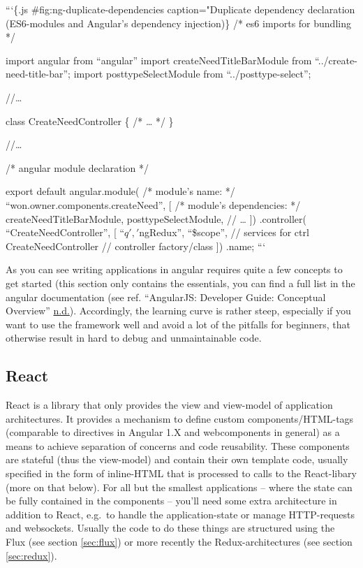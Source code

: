 \documentclass[a4paper,,tablecaptionabove]{scrbook}
\begin{document}
```\{.js \#fig:ng-duplicate-dependencies caption="Duplicate dependency
declaration (ES6-modules and Angular's dependency injection)\} /* es6
imports for bundling */

import angular from \enquote{angular} import createNeedTitleBarModule
from \enquote{../create-need-title-bar}; import posttypeSelectModule
from \enquote{../posttype-select};

//\ldots{}

class CreateNeedController \{ /* \ldots{} */ \}

//\ldots{}

/* angular module declaration */

export default angular.module( /* module's name: */
\enquote{won.owner.components.createNeed}, {[} /* module's dependencies:
*/ createNeedTitleBarModule, posttypeSelectModule, // \ldots{} {]})
.controller( \enquote{CreateNeedController}, {[}
\enquote{\(q', '\)ngRedux}, \enquote{\$scope}, // services for ctrl
CreateNeedController // controller factory/class {]}) .name; ```

As you can see writing applications in angular requires quite a few
concepts to get started (this section only contains the essentials, you
can find a full list in the angular documentation (see ref. ``AngularJS:
Developer Guide: Conceptual Overview''
\protect\hyperlink{ref-AngularJSDeveloperGuide}{n.d.}). Accordingly, the
learning curve is rather steep, especially if you want to use the
framework well and avoid a lot of the pitfalls for beginners, that
otherwise result in hard to debug and unmaintainable code.

\hypertarget{react}{%
\subsection{React}\label{react}}

React is a library that only provides the view and view-model of
application architectures. It provides a mechanism to define custom
components/HTML-tags (comparable to directives in Angular 1.X and
webcomponents in general) as a means to achieve separation of concerns
and code reusability. These components are stateful (thus the
view-model) and contain their own template code, usually specified in
the form of inline-HTML that is processed to calls to the React-libary
(more on that below). For all but the smallest applications -- where the
state can be fully contained in the components -- you'll need some extra
architecture in addition to React, e.g.~to handle the application-state
or manage HTTP-requests and websockets. Usually the code to do these
things are structured using the Flux (see section \ref{sec:flux}) or
more recently the Redux-architectures (see section \ref{sec:redux}).
\end{document}
